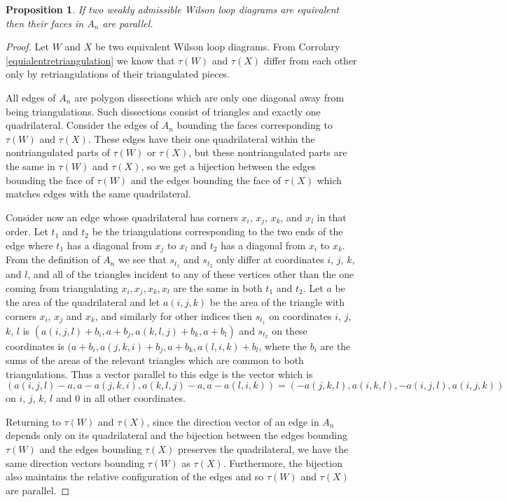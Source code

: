 \documentclass[11pt]{article}
\newcommand{\sanote}{\todo[color=violet!30]}
\newtheorem{prop}[thm]{Proposition}
\theoremstyle{remark}
\theoremstyle{definition}
\begin{document}
\begin{prop}\label{prop easy way}
  If two weakly admissible Wilson loop diagrams are equivalent then their faces in $A_n$ are parallel.
\end{prop}

\begin{proof}
  Let $W$ and $X$ be two equivalent Wilson loop diagrams.  From Corrolary \ref{equialentretriangulation} we know that $\tau(W)$ and $\tau(X)$ differ from each other only by retriangulations of their triangulated pieces. 

All edges of $A_n$ are polygon dissections which are only one diagonal away from being triangulations.  Such dissections consist of triangles and exactly one quadrilateral.  Consider the edges of $A_n$ bounding the faces corresponding to $\tau(W)$ and $\tau(X)$.  These edges have their one quadrilateral within the nontriangulated parts of $\tau(W)$ or $\tau(X)$, but these nontriangulated parts are the same in $\tau(W)$ and $\tau(X)$, so we get a bijection between the edges bounding the face of $\tau(W)$ and the edges bounding the face of $\tau(X)$ which matches edges with the same quadrilateral.

  Consider now an edge whose quadrilateral has corners $x_i$, $x_j$, $x_k$, and $x_l$ in that order.  Let $t_1$ and $t_2$ be the triangulations corresponding to the two ends of the edge where $t_1$ has a diagonal from $x_j$ to $x_l$ and $t_2$ has a diagonal from $x_i$ to $x_k$.  From the definition of $A_n$ we see that $s_{t_1}$ and $s_{t_2}$ only differ at coordinates $i$, $j$, $k$, and $l$, and all of the triangles incident to any of these vertices other than the one coming from triangulating $x_i, x_j, x_k, x_l$ are the same in both $t_1$ and $t_2$.  Let $a$ be the area of the quadrilateral and let $a(i,j,k)$ be the area of the triangle with corners $x_i$, $x_j$ and $x_k$, and similarly for other indices then $s_{t_1}$ on coordinates $i$, $j$, $k$, $l$ is $(a(i,j,l) + b_i, a+b_j, a(k,l,j)+b_k, a+b_l)$ and $s_{t_2}$ on these coordinates is $(a + b_i, a(j,k,i)+b_j, a+b_k, a(l,i,k)+b_l$, where the $b_i$ are the sums of the areas of the relevant triangles which are common to both triangulations.  Thus a vector parallel to this edge is the vector which is $(a(i,j,l) - a, a-a(j,k,i), a(k,l,j)-a, a-a(l,i,k)) = (-a(j,k,l), a(i,k,l), -a(i,j,l), a(i,j,k))$ on $i$, $j$, $k$, $l$ and $0$ in all other coordinates. \sanote{definitely need a picture}

  Returning to $\tau(W)$ and $\tau(X)$, since the direction vector of an edge in $A_n$ depends only on its quadrilateral and the bijection between the edges bounding $\tau(W)$ and the edges bounding $\tau(X)$ preserves the quadrilateral, we have the same direction vectors bounding $\tau(W)$ as $\tau(X)$.  Furthermore, the bijection also maintains the relative configuration of the edges and so $\tau(W)$ and $\tau(X)$ are parallel.
\end{proof}
\end{document}
